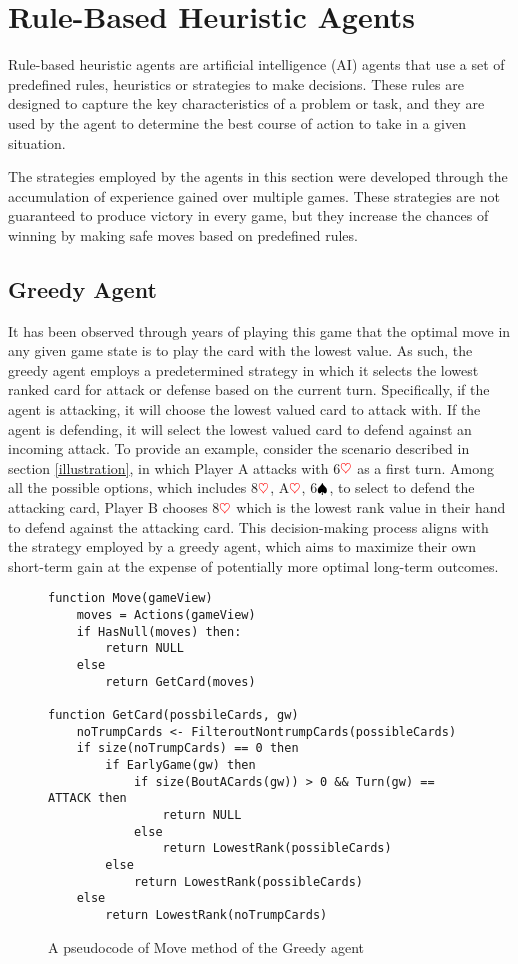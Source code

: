 \section{Rule-Based Heuristic Agents}

Rule-based heuristic agents are artificial intelligence (AI) agents that use a set of predefined rules, heuristics or strategies to make decisions. These rules are designed to capture the key characteristics of a problem or task, and they are used by the agent to determine the best course of action to take in a given situation.

The strategies employed by the agents in this section were developed through the accumulation of experience gained over multiple games. These strategies are not guaranteed to produce victory in every game, but they increase the chances of winning by making safe moves based on predefined rules. 

\subsection{Greedy Agent}

It has been observed through years of playing this game that the optimal move in any given game state is to play the card with the lowest value. As such, the greedy agent employs a predetermined strategy in which it selects the lowest ranked card for attack or defense based on the current turn. Specifically, if the agent is attacking, it will choose the lowest valued card to attack with. If the agent is defending, it will select the lowest valued card to defend against an incoming attack. To provide an example, consider the scenario described in section \ref{illustration}, in which Player A attacks with 6$\textcolor{red}{\heartsuit}$ as a first turn. Among all the possible options, which includes 8$\textcolor{red}{\heartsuit}$, A$\textcolor{red}{\heartsuit}$, 6$\textcolor{black}{\spadesuit}$, to select to defend the attacking card, Player B chooses 8$\textcolor{red}{\heartsuit}$ which is the lowest rank value in their hand to defend against the attacking card. This decision-making process aligns with the strategy employed by a greedy agent, which aims to maximize their own short-term gain at the expense of potentially more optimal long-term outcomes.

\begin{figure}[h]
\captionsetup{justification=centering}
\begin{lstlisting}
function Move(gameView)
	moves = Actions(gameView)
	if HasNull(moves) then:
		return NULL
	else
		return GetCard(moves)

function GetCard(possbileCards, gw)
	noTrumpCards <- FilteroutNontrumpCards(possibleCards)
	if size(noTrumpCards) == 0 then
		if EarlyGame(gw) then
			if size(BoutACards(gw)) > 0 && Turn(gw) == ATTACK then
				return NULL
			else
				return LowestRank(possibleCards)
		else
			return LowestRank(possibleCards)
	else
		return LowestRank(noTrumpCards)
\end{lstlisting}
\caption{A pseudocode of Move method of the Greedy agent}
\label{fig:greedyMove}
\end{figure}

